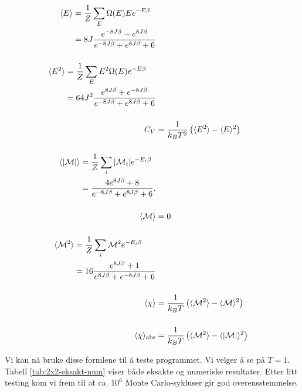 \documentclass[11pt]{article}
\begin{document}
\begin{align}
\begin{split}
  \langle E \rangle &= \frac{ 1 }{ Z }\sum_E \Omega(E) E e^{-E\beta}\\
           &= 8J \frac{ e^{-8J\beta}  - e^{8J\beta}}{ e^{-8J\beta}
             + e^{8J\beta} + 6}\label{eq:mean-E-2x2}
\end{split}\\[0.5cm]
\begin{split}
  \langle E^2 \rangle &= \frac{ 1 }{ Z }\sum_E E^2\Omega(E)e^{-E\beta}\\
  &= 64J^2 \frac{ e^{8J\beta} + e^{-8J\beta} }{ e^{-8J\beta} +
    e^{8J\beta} + 6 }\label{eq:mean-E2-2x2}
\end{split}\\[0.5cm]
  C_V &= \frac{ 1}{k_BT^2} \left( \langle E^2 \rangle - \langle E \rangle^2 \right)\label{eq:mean-C-2x2}\\[0.5cm]
\begin{split}
  \langle |\mathcal{M}| \rangle &= \frac{ 1 }{ Z }\sum_i |\mathcal{M}_i| e^{-E_i\beta}\\
  &= \frac{ 4e^{8J\beta} + 8  }{ e^{-8J\beta} + e^{8J\beta} + 6 }.\label{eq:mean-abs-M-2x2}
\end{split}\\[0.5cm]
\langle \mathcal{M} \rangle &= 0\label{eq:mean-M-2x2}\\[0.5cm]
\begin{split}
  \langle \mathcal{M}^2 \rangle &= \frac{ 1 }{ Z } \sum_i \mathcal{M}^2
  e^{-E_i\beta}\\
  &= 16 \frac{ e^{8J\beta} + 1 }{ e^{8J\beta} + e^{-8J\beta}+6 }\label{eq:mean-M2-2x2}
\end{split}\\[0.5cm]
\langle \chi \rangle &= \frac{ 1 }{ k_B T} \left(
              \langle \mathcal{M}^2 \rangle-\langle \mathcal{M} \rangle^2
              \right)\label{eq:mean-chi-2x2}\\[0.5cm]
\langle \chi \rangle_\text{abs} &= \frac{ 1 }{ k_B T} \left( \langle \mathcal{M}^2 \rangle-\langle \mathcal{|M|} \rangle^2 \right)\label{eq:mean-chi-2x2-abs}
\end{align}

Vi kan nå bruke disse formlene til å teste programmet. Vi velger å se
på $T=1$. Tabell \ref{tab:2x2-eksakt-num} viser både eksakte og
numeriske resultater. Etter litt testing kom vi frem til at ca. $10^6$
Monte Carlo-sykluser gir god overensstemmelse.
\end{document}
